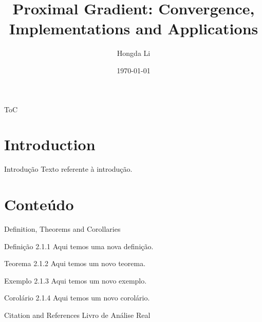 \documentclass[11pt]{beamer}
\author{Hongda Li}
\title{Proximal Gradient: Convergence, Implementations and Applications}
\institute[]{UBC Okanagan}
\date{\today}
\begin{document}
\begin{frame}
    \titlepage
\end{frame}

\begin{frame}{ToC}
    \tableofcontents
\end{frame}

\section{Introduction}
    \begin{frame}{Introdução}
        Texto referente à introdução.
    \end{frame}

\section{Conteúdo}
    \begin{frame}{Definition, Theorems and Corollaries}
        \begin{block}{Definição 2.1.1}
        Aqui temos uma nova definição.
        \end{block}

        \begin{block}{Teorema 2.1.2}
        Aqui temos um novo teorema.
        \end{block}

        \begin{block}{Exemplo 2.1.3}
        Aqui temos um novo exemplo.
        \end{block}

        \begin{block}{Corolário 2.1.4}
        Aqui temos um novo corolário.
        \end{block}
    \end{frame}
    \begin{frame}{Citation and References}
        Livro de Análise Real~\cite{lima2004analise}
    \end{frame}
\end{document}
